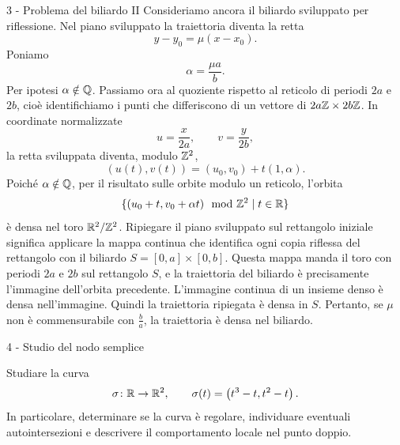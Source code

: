 \documentclass[a4paper]{article}
\begin{document}
\begin{snippetsolution}{3 - Problema del biliardo II}
    Consideriamo ancora il biliardo sviluppato per riflessione. Nel piano sviluppato la traiettoria diventa la retta
    \[
        y-y_0=\mu(x-x_0).
    \]
    Poniamo
    \[
        \alpha=\frac{\mu a}{b}.
    \]
    Per ipotesi \(\alpha\notin\mathbb{Q}\). Passiamo ora al quoziente rispetto al reticolo di periodi \(2a\) e \(2b\), cioè identifichiamo i punti che differiscono di un vettore di \(2a\mathbb{Z}\times 2b\mathbb{Z}\). In coordinate normalizzate
    \[
        u=\frac{x}{2a},
        \qquad
        v=\frac{y}{2b},
    \]
    la retta sviluppata diventa, modulo \(\mathbb{Z}^2\),
    \[
        (u(t),v(t))=(u_0,v_0)+t(1,\alpha).
    \]
    Poiché \(\alpha\notin\mathbb{Q}\), per il risultato sulle orbite modulo un reticolo, l'orbita
    \[
        \{(u_0+t,v_0+\alpha t)\mod {\mathbb{Z}}^2\mid t\in\mathbb{R}\}
    \]
    è densa nel toro \(\mathbb{R}^2/\mathbb{Z}^2\).
    Ripiegare il piano sviluppato sul rettangolo iniziale significa applicare la mappa continua che identifica ogni copia riflessa del rettangolo con il biliardo \(S=[0,a]\times[0,b]\). Questa mappa manda il toro con periodi \(2a\) e \(2b\) sul rettangolo \(S\), e la traiettoria del biliardo è precisamente l'immagine dell'orbita precedente.
    L'immagine continua di un insieme denso è densa nell'immagine. Quindi la traiettoria ripiegata è densa in \(S\). Pertanto, se \(\mu\) non è commensurabile con \(\frac ba\), la traiettoria è densa nel biliardo.
\end{snippetsolution}

\begin{snippetexercise}{4 - Studio del nodo semplice}
    \begin{figure}
        \vspace{-1cm}
    \end{figure}
    Studiare la curva
    \[
        \sigma\colon\mathbb{R}\to\mathbb{R}^2,
        \qquad
        \sigma(t)=\left(t^3-t,t^2-t\right).
    \]
    In particolare, determinare se la curva è regolare, individuare
    eventuali autointersezioni e descrivere il comportamento locale nel
    punto doppio. \wrapfill
\end{snippetexercise}
\end{document}
